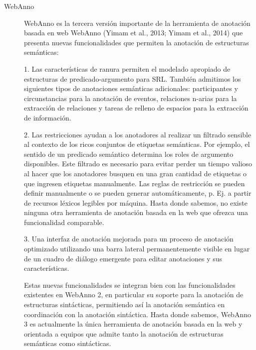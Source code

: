 \begin{description}
\item[WebAnno]

WebAnno es la tercera versión importante de la herramienta de anotación basada en web WebAnno (Yimam et al., 2013; Yimam et al., 2014) que presenta nuevas funcionalidades que permiten la anotación de estructuras semánticas:

1. Las características de ranura permiten el modelado apropiado de estructuras de predicado-argumento para SRL. También admitimos los siguientes tipos de anotaciones semánticas adicionales: participantes y circunstancias para la anotación de eventos, relaciones n-arias para la extracción de relaciones y tareas de relleno de espacios para la extracción de información.

2. Las restricciones ayudan a los anotadores al realizar un filtrado sensible al contexto de los ricos conjuntos de etiquetas semánticas. Por ejemplo, el sentido de un predicado semántico determina los roles de argumento disponibles. Este filtrado es necesario para evitar perder un tiempo valioso al hacer que los anotadores busquen en una gran cantidad de etiquetas o que ingresen etiquetas manualmente. Las reglas de restricción se pueden definir manualmente o se pueden generar automáticamente, p. Ej. a partir de recursos léxicos legibles por máquina. Hasta donde sabemos, no existe ninguna otra herramienta de anotación basada en la web que ofrezca una funcionalidad comparable.

3. Una interfaz de anotación mejorada para un proceso de anotación optimizado utilizando una barra lateral permanentemente visible en lugar de un cuadro de diálogo emergente para editar anotaciones y sus características.

Estas nuevas funcionalidades se integran bien con las funcionalidades existentes en WebAnno 2, en particular su soporte para la anotación de estructuras sintácticas, permitiendo así la anotación semántica en coordinación con la anotación sintáctica. Hasta donde sabemos, WebAnno 3 es actualmente la única herramienta de anotación basada en la web y orientada a equipos que admite tanto la anotación de estructuras semánticas como sintácticas.


\end{description}
